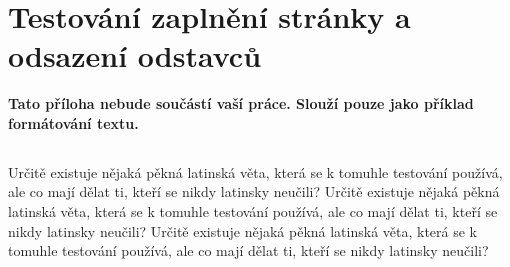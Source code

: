 \documentclass[11pt,twoside,a4paper]{book}
\begin{document}

%




%
{
\def\CS{$\cal C\kern-0.1667em\lower.5ex\hbox{$\cal S$}\kern-0.075em $}

}

%

\appendix

\chapter{Testování zaplnění stránky a odsazení odstavců}
\textbf{\large Tato příloha nebude součástí vaší práce. 
Slouží pouze jako příklad formátování textu.}

\section*{}
Určitě existuje nějaká pěkná latinská věta, která se k tomuhle testování používá, ale co mají dělat ti, kteří se nikdy latinsky neučili? Určitě existuje nějaká pěkná latinská věta, která se k tomuhle testování používá, ale co mají dělat ti, kteří se nikdy latinsky neučili? Určitě existuje nějaká pěkná latinská věta, která se k tomuhle testování používá, ale co mají dělat ti, kteří se nikdy latinsky neučili?
\end{document}
